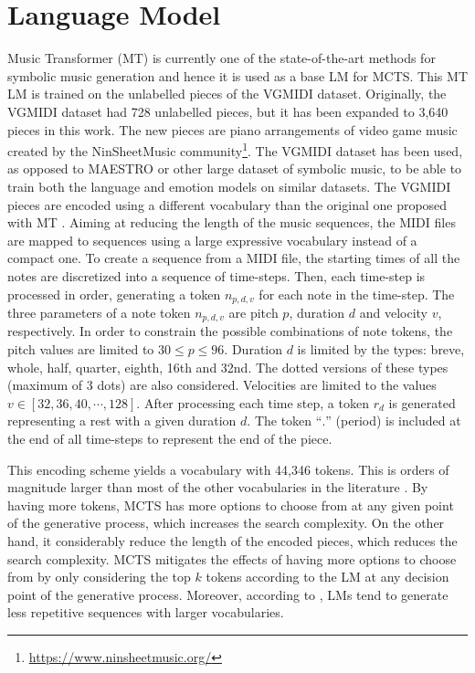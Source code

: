 

\section{Language Model}

Music Transformer (MT) \cite{huang2018music} is currently one of the state-of-the-art methods for symbolic music generation and hence it is used as a base LM for MCTS. This MT LM is trained on the unlabelled pieces of the VGMIDI dataset. Originally, the VGMIDI dataset had 728 unlabelled pieces, but it has been expanded to 3,640 pieces in this work. The new pieces are piano arrangements of video game music created by the NinSheetMusic community\footnote{\url{https://www.ninsheetmusic.org/}}. The VGMIDI dataset has been used, as opposed to MAESTRO \cite{hawthorne2018enabling} or other large dataset of symbolic music, to be able to train both the language and emotion models on similar datasets.
The VGMIDI pieces are encoded using a different vocabulary than the original one proposed with MT \cite{huang2018music}. Aiming at reducing the length of the music sequences, the MIDI files are mapped to sequences using a large expressive vocabulary instead of a compact one. To create a sequence from a MIDI file, the starting times of all the notes are discretized into a sequence of time-steps. Then, each time-step is processed in order, generating a token $n_{p, d, v}$ for each note in the time-step. The three parameters of a note token $n_{p, d, v}$ are pitch $p$, duration $d$ and velocity $v$, respectively. In order to constrain the possible combinations of note tokens, the pitch values are limited to $30 \leq p \leq 96$. Duration $d$ is limited by the types: breve, whole, half, quarter, eighth, 16th and 32nd. The dotted versions of these types (maximum of 3 dots) are also considered. Velocities are limited to the values $v \in [32, 36, 40, \cdots, 128]$. After processing each time step, a token $r_d$ is generated representing a rest with a given duration $d$. The token ``$.$'' (period) is included at the end of all time-steps to represent the end of the piece.

This encoding scheme yields a vocabulary with 44,346 tokens. This is orders of magnitude larger than most of the other vocabularies in the literature \cite{briot2017deep}. By having more tokens, MCTS has more options to choose from at any given point of the generative process, which increases the search complexity. On the other hand, it considerably reduce the length of the encoded pieces, which reduces the search complexity. MCTS mitigates the effects of having more options to choose from by only considering the top $k$ tokens according to the LM at any decision point of the generative process. Moreover, according to \cite{holtzman2018learning}, LMs tend to generate less repetitive sequences with larger vocabularies.

